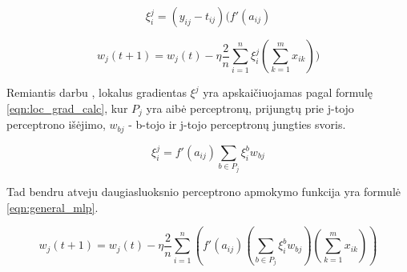 \begin{equation}
\label{eqn:loc_grad}
	\xi^j_i = (y_{ij} - t_{ij})(f'(a_{ij})
\end{equation}

\begin{equation}
\label{eqn:general_with_loc_grad}
	w_j(t + 1) = w_j(t) - \eta \dfrac{2}{n}\sum_{i = 1}^{n} \xi^j_i(\sum_{k = 1}^{m} x_{ik}))
\end{equation}

Remiantis darbu \cite{feedbackAlg}, lokalus gradientas $\xi^j$ yra apskaičiuojamas pagal formulę \ref{eqn:loc_grad_calc}, kur $P_j$ yra aibė perceptronų, prijungtų prie j-tojo perceptrono išėjimo, $w_{bj}$ - b-tojo ir j-tojo perceptronų jungties svoris.

\begin{equation}
\label{eqn:loc_grad_calc}
	\xi^j_i = f'(a_{ij})\sum_{b \in P_j}\xi^b_i w_{bj}
\end{equation}

Tad bendru atveju daugiasluoksnio perceptrono apmokymo funkcija yra formulė \ref{eqn:general_mlp}.

\begin{equation}
\label{eqn:general_mlp}
w_j(t + 1) = w_j(t) - \eta \dfrac{2}{n}\sum_{i = 1}^{n} (f'(a_{ij})(\sum_{b \in P_j}\xi^b_i w_{bj})(\sum_{k = 1}^{m} x_{ik}))
\end{equation}
